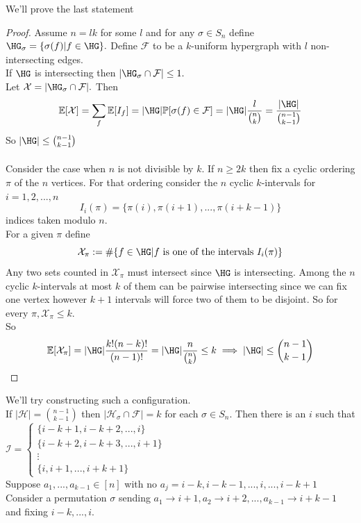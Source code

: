 \documentclass[a4paper]{article}
\begin{document}
We'll prove the last statement
\begin{proof}
    Assume $n=lk$ for some $l$ and for any $\sigma\in S_n$ define $\HG_\sigma=\{\sigma(f) | f\in \HG\}.$ Define $\mathcal{F}$ to be a $k$-uniform hypergraph with $l$ non-intersecting edges.\\ 
    If $\HG$ is intersecting then $|\HG_\sigma\cap \mathcal{F}|\leq 1.$ \\
    Let $\mathcal{X}=|\HG_\sigma\cap \mathcal{F}|.$ Then $$\mathbb{E}[\mathcal{X}]=\sum_f\mathbb{E}[I_f]=|\HG|\mathbb{P}[\sigma(f)\in \mathcal{F}]=|\HG|\frac{l}{{n \choose k}}=\frac{|\HG|}{{n-1 \choose k-1}}$$
    So $|\HG|\leq {n-1 \choose k-1}$\\\\
    Consider the case when $n$ is not divisible by $k.$ If $n\geq 2k$ then fix a cyclic ordering $\pi$ of the $n$ vertices. For that ordering consider the $n$ cyclic $k$-intervals for $i=1,2,...,n$  $$I_i(\pi)=\{\pi(i),\pi(i+1),...,\pi(i+k-1)\}$$
    indices taken modulo $n.$\\
    For a given $\pi$ define $$\mathcal{X}_\pi:=\#\{f\in \HG | f \text{ is one of the intervals } I_i(\pi)\}$$
    Any two sets counted in $\mathcal{X}_\pi$ must intersect since $\HG$ is intersecting. Among the $n$ cyclic $k$-intervals at most $k$ of them can be pairwise intersecting since we can fix one vertex however $k+1$ intervals will force two of them to be disjoint. So for every $\pi, \mathcal{X}_\pi\leq k.$\\
    So $$\mathbb{E}[\mathcal{X}_\pi]=|\HG|\frac{k!(n-k)!}{(n-1)!}=|\HG|\frac{n}{{n \choose k}}\leq k\implies |\HG|\leq {n-1 \choose k-1}$$
\end{proof}
\noindent We'll try constructing such a configuration.\\
If $|\mathcal{H}|={n-1 \choose k-1}$ then $|\mathcal{H}_\sigma\cap \mathcal{F}|=k$ for each $\sigma\in S_n$. Then there is an $i$ such that $\mathcal{I}=\begin{cases}
    \{i-k+1, i-k+2,...,i\} \\ \{i-k+2,i-k+3,...,i+1\} \\ \vdots \\ \{i,i+1,...,i+k+1\}
\end{cases}$ \\
Suppose $a_1,...,a_{k-1}\in [n]$ with no $a_j=i-k,i-k-1,...,i,...,i-k+1$\\
Consider a permutation $\sigma$ sending $a_1\to i+1,a_2\to i+2,...,a_{k-1}\to i+k-1$ and fixing $i-k,...,i.$\\
\end{document}
